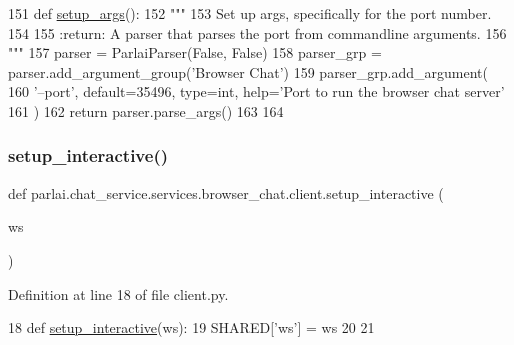 \begin{DoxyCode}
151 \textcolor{keyword}{def }\hyperlink{namespaceparlai_1_1chat__service_1_1services_1_1terminal__chat_1_1client_abcdfe1196113d8ab4476dcde362c83d8}{setup\_args}():
152     \textcolor{stringliteral}{"""}
153 \textcolor{stringliteral}{    Set up args, specifically for the port number.}
154 \textcolor{stringliteral}{}
155 \textcolor{stringliteral}{    :return: A parser that parses the port from commandline arguments.}
156 \textcolor{stringliteral}{    """}
157     parser = ParlaiParser(\textcolor{keyword}{False}, \textcolor{keyword}{False})
158     parser\_grp = parser.add\_argument\_group(\textcolor{stringliteral}{'Browser Chat'})
159     parser\_grp.add\_argument(
160         \textcolor{stringliteral}{'--port'}, default=35496, type=int, help=\textcolor{stringliteral}{'Port to run the browser chat server'}
161     )
162     \textcolor{keywordflow}{return} parser.parse\_args()
163 
164 
\end{DoxyCode}
\mbox{\label{namespaceparlai_1_1chat__service_1_1services_1_1browser__chat_1_1client_a207d7e8eedf4a062395e9e9c4f8338ff}} 
\subsubsection{\texorpdfstring{setup\+\_\+interactive()}{setup\_interactive()}}
{\footnotesize\ttfamily def parlai.\+chat\+\_\+service.\+services.\+browser\+\_\+chat.\+client.\+setup\+\_\+interactive (\begin{DoxyParamCaption}\item[{}]{ws }\end{DoxyParamCaption})}



Definition at line 18 of file client.\+py.


\begin{DoxyCode}
18 \textcolor{keyword}{def }\hyperlink{namespaceparlai_1_1chat__service_1_1services_1_1browser__chat_1_1client_a207d7e8eedf4a062395e9e9c4f8338ff}{setup\_interactive}(ws):
19     SHARED[\textcolor{stringliteral}{'ws'}] = ws
20 
21 
\end{DoxyCode}


